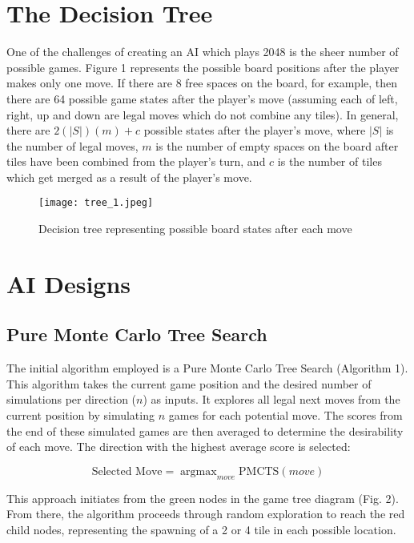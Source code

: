 \documentclass{article}
\DeclareMathOperator*{\argmax}{argmax}
\begin{document}
\section{The Decision Tree}

One of the challenges of creating an AI which plays 2048 is the sheer number of possible games.  Figure 1 represents the possible board positions after the player makes only one move.  If there are 8 free spaces on the board, for example, then there are 64 possible game states after the player's move (assuming each of left, right, up and down are legal moves which do not combine any tiles).  In general, there are $2(|S|)(m) + c$ possible states after the player's move, where $|S|$ is the number of legal moves,  $m$ is the number of empty spaces on the board after tiles have been combined from the player's turn, and $c$ is the number of tiles which get merged as a result of the player's move.

\begin{figure}[H]
\centering
\texttt{[image: tree\_1.jpeg]}
\caption{Decision tree representing possible board states after each move}
\label{fig:tree1}
\end{figure}

\section{AI Designs}
\subsection{Pure Monte Carlo Tree Search}
The initial algorithm employed is a Pure Monte Carlo Tree Search (Algorithm 1). This algorithm takes the current game position and the desired number of simulations per direction ($n$) as inputs. It explores all legal next moves from the current position by simulating $n$ games for each potential move. The scores from the end of these simulated games are then averaged to determine the desirability of each move. The direction with the highest average score is selected: 

\begin{equation}
\label{PMCTS_move_selection}
  \textrm{Selected Move} = \argmax_{move} \text{PMCTS}(move)
\end{equation}


This approach initiates from the green nodes in the game tree diagram (Fig. 2). From there, the algorithm proceeds through random exploration to reach the red child nodes, representing the spawning of a 2 or 4 tile in each possible location.
\end{document}
